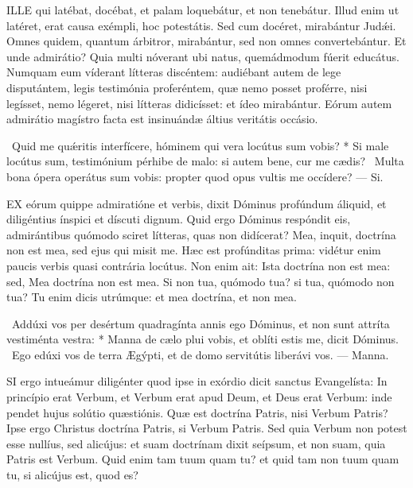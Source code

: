 

\lettrine[lines=2]{I}{LLE} qui latébat, docébat, et palam loquebátur, et non tenebátur. Illud enim ut latéret, erat causa exémpli, hoc potestátis. Sed cum docéret, mirabántur Judǽi. Omnes quidem, quantum árbitror, mirabántur, sed non omnes convertebántur. Et unde admirátio? Quia multi nóverant ubi natus, quemádmodum fúerit educátus. Numquam eum víderant lítteras discéntem: audiébant autem de lege disputántem, legis testimónia proferéntem, quæ nemo posset proférre, nisi legísset, nemo légeret, nisi lítteras didicísset: et ídeo mirabántur. Eórum autem admirátio magístro facta est insinuándæ áltius veritátis occásio.

\R\ Quid me quǽritis interfícere, hóminem qui vera locútus sum vobis? * Si male locútus sum, testimónium pérhibe de malo: si autem bene, cur me cædis? \V\ Multa bona ópera operátus sum vobis: propter quod opus vultis me occídere? --- Si.


\lettrine[lines=2]{E}{X} eórum quippe admiratióne et verbis, dixit Dóminus profúndum áliquid, et diligéntius ínspici et díscuti dignum. Quid ergo Dóminus respóndit eis, admirántibus quómodo sciret lítteras, quas non didícerat? Mea, inquit, doctrína non est mea, sed ejus qui misit me. Hæc est profúnditas prima: vidétur enim paucis verbis quasi contrária locútus. Non enim ait: Ista doctrína non est mea: sed, Mea doctrína non est mea. Si non tua, quómodo tua? si tua, quómodo non tua? Tu enim dicis utrúmque: et mea doctrína, et non mea.

\R\ Addúxi vos per desértum quadragínta annis ego Dóminus, et non sunt attríta vestiménta vestra: * Manna de cælo plui vobis, et oblíti estis me, dicit Dóminus. \V\ Ego edúxi vos de terra Ægýpti, et de domo servitútis liberávi vos. --- Manna.


\lettrine[lines=2]{S}{I} ergo intueámur diligénter quod ipse in exórdio dicit sanctus Evangelísta: In princípio erat Verbum, et Verbum erat apud Deum, et Deus erat Verbum: inde pendet hujus solútio quæstiónis. Quæ est doctrína Patris, nisi Verbum Patris? Ipse ergo Christus doctrína Patris, si Verbum Patris. Sed quia Verbum non potest esse nullíus, sed alicújus: et suam doctrínam dixit seípsum, et non suam, quia Patris est Verbum. Quid enim tam tuum quam tu? et quid tam non tuum quam tu, si alicújus est, quod es?

